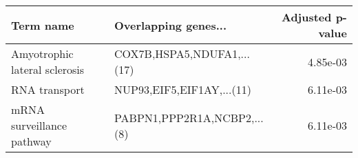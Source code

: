 \begin{tabular}{llr}
\toprule
                    Term name &        Overlapping genes... &  Adjusted p-value \\
\midrule
Amyotrophic lateral sclerosis &  COX7B,HSPA5,NDUFA1,...(17) &          4.85e-03 \\
                RNA transport &   NUP93,EIF5,EIF1AY,...(11) &          6.11e-03 \\
    mRNA surveillance pathway & PABPN1,PPP2R1A,NCBP2,...(8) &          6.11e-03 \\
\bottomrule
\end{tabular}
